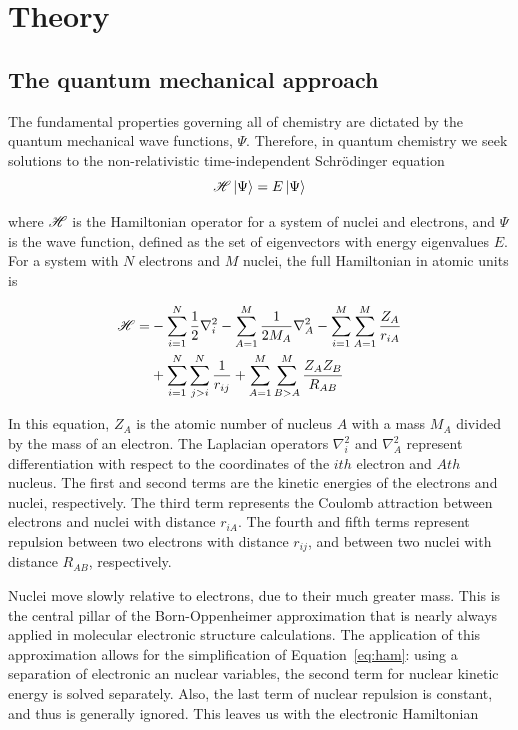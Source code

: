 
\chapter{Theory}
\label{ch:theory}

\section{The quantum mechanical approach}

The fundamental properties governing all of chemistry are dictated by the
quantum mechanical wave functions, $\Psi$. Therefore, in quantum chemistry we
seek solutions to the non-relativistic time-independent Schr{\"o}dinger
equation \begin{equation}
\mathscr{H} \ket{\Psi} = E \ket{\Psi}
\label{eq:schrodinger}
\end{equation}

\noindent where $\mathscr{H}$ is the Hamiltonian operator for a system of nuclei and
electrons, and $\Psi$ is the wave function, defined as the set of eigenvectors
with energy eigenvalues $E$.\cite{Griffiths2016} For a system with $N$
electrons and $M$ nuclei, the full Hamiltonian in atomic units is

\begin{equation}
\begin{split}
\mathscr{H} = &-\sum_{i=1}^N \frac{1}{2}\nabla_i^2 - \sum_{A=1}^M\frac{1}{2M_A}\nabla_A^2
-\sum_{i=1}^M\sum_{A=1}^M\frac{Z_A}{r_{iA}} \\
&+ \sum_{i=1}^N\sum_{j>i}^N \frac{1}{r_{ij}} + \sum_{A=1}^M\sum_{B>A}^M
\frac{Z_A Z_B}{R_{AB}}
\label{eq:ham}
\end{split}
\end{equation}

\noindent In this equation, $Z_A$ is the atomic number of nucleus $A$ with a
mass $M_A$ divided by the mass of an electron. The Laplacian operators
$\nabla_i^2$ and $\nabla_A^2$ represent differentiation with respect to the
coordinates of the $ith$ electron and $Ath$ nucleus. The first and second terms
are the kinetic energies of the electrons and nuclei, respectively. The third
term represents the Coulomb attraction between electrons and nuclei with
distance $r_{iA}$. The fourth and fifth terms represent repulsion between two
electrons with distance $r_{ij}$, and between two nuclei with distance
$R_{AB}$, respectively.

Nuclei move slowly relative to electrons, due to their much greater mass. This
is the central pillar of the Born-Oppenheimer approximation that is nearly
always applied in molecular electronic structure calculations. The application
of this approximation allows for the simplification of Equation~\ref{eq:ham}:
using a separation of electronic an nuclear variables, the second term for
nuclear kinetic energy is solved separately. Also, the last term of nuclear
repulsion is constant, and thus is generally ignored. This leaves us with the
electronic Hamiltonian

